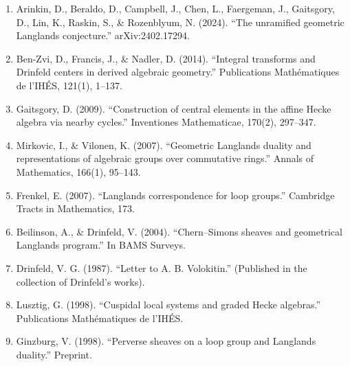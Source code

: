 \begin{enumerate}
\item Arinkin, D., Beraldo, D., Campbell, J., Chen, L., Faergeman, J., Gaitsgory, D., Lin, K., Raskin, S., \& Rozenblyum, N. (2024). ``The unramified geometric Langlands conjecture.'' arXiv:2402.17294.
\item Ben-Zvi, D., Francis, J., \& Nadler, D. (2014). ``Integral transforms and Drinfeld centers in derived algebraic geometry.'' Publications Math\'ematiques de l'IH\'ES, 121(1), 1--137.
\item Gaitsgory, D. (2009). ``Construction of central elements in the affine Hecke algebra via nearby cycles.'' Inventiones Mathematicae, 170(2), 297--347.
\item Mirkovic, I., \& Vilonen, K. (2007). ``Geometric Langlands duality and representations of algebraic groups over commutative rings.'' Annals of Mathematics, 166(1), 95--143.
\item Frenkel, E. (2007). ``Langlands correspondence for loop groups.'' Cambridge Tracts in Mathematics, 173.
\item Beilinson, A., \& Drinfeld, V. (2004). ``Chern--Simons sheaves and geometrical Langlands program.'' In BAMS Surveys.
\item Drinfeld, V. G. (1987). ``Letter to A. B. Volokitin.'' (Published in the collection of Drinfeld's works).
\item Lusztig, G. (1998). ``Cuspidal local systems and graded Hecke algebras.'' Publications Math\'ematiques de l'IH\'ES.
\item Ginzburg, V. (1998). ``Perverse sheaves on a loop group and Langlands duality.'' Preprint.
\end{enumerate}